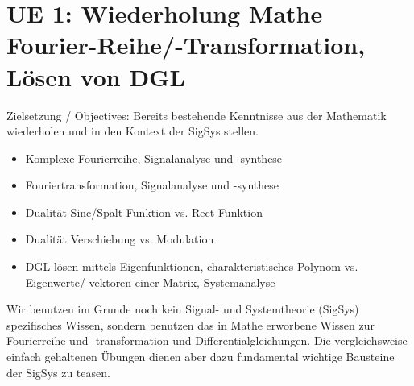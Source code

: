 
\newpage
\section{UE 1: Wiederholung Mathe Fourier-Reihe/-Transformation, Lösen von DGL}
Zielsetzung / Objectives: Bereits bestehende Kenntnisse aus der Mathematik
wiederholen und in den Kontext der SigSys stellen.

\begin{itemize}
\item Komplexe Fourierreihe, Signalanalyse und -synthese
\item Fouriertransformation, Signalanalyse und -synthese
\item Dualität Sinc/Spalt-Funktion vs. Rect-Funktion
\item Dualität Verschiebung vs. Modulation
\item DGL lösen mittels Eigenfunktionen, charakteristisches Polynom vs. Eigenwerte/-vektoren einer Matrix, Systemanalyse
\end{itemize}
%
Wir benutzen im Grunde noch kein Signal- und Systemtheorie (SigSys) spezifisches Wissen,
sondern benutzen das in Mathe erworbene Wissen zur Fourierreihe und -transformation
und Differentialgleichungen. Die vergleichsweise einfach gehaltenen
Übungen dienen aber dazu fundamental wichtige Bausteine der SigSys zu teasen.


\newpage
